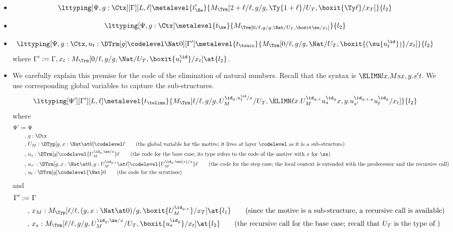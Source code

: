 \begin{itemize}
\item
  \[
    \lttyping[\Psi,g:\Ctx][\Gamma][L,\ell]\metalevel{t'_\Se}{M_\Trm[{2 + \ell}/\ell,g/g, \Ty{1 + \ell}/U_T,\boxit{\Ty \ell}/x_T]}{l_2}
  \]
\item
  \[
    \lttyping[\Psi, g : \Ctx]\metalevel{t_\ze}{M_\Trm[0/\ell,g/g,\Nat/U_T,\boxit \ze/x_t]}{l_2}    
  \]
\item 
  \[
    \lttyping[\Psi, g : \Ctx,u_t: \DTrm[g]\codelevel\Nat 0][\Gamma']\metalevel{t_\tsucc}{M_\Trm[0/\ell,g/g,\Nat/U_T,\boxit{(\su{u_t^\id})}/x_t]}{l_2}    
  \]
  where $\Gamma' := \Gamma, x_t:M_\Trm[0/\ell,g/g,\Nat/U_T,\boxit{u_t^\id}/x_t] \at{l_2}$.
\item We carefully explain this premise for the code of the elimination of natural
  numbers. %
  Recall that the syntax is $\ELIMN l{x.M}{s}{x,y.s'}t$. %
  We use corresponding global variables to capture the sub-structures. 
  \[
    \lttyping[\Psi'][\Gamma'][L,\ell]\metalevel{t_{\telimn}}{M_\Trm[\ell/\ell,g/g,U_M^{\id_g,u_t^\id/x}/U_T,\ELIMN \ell{x.U_M^{\id_{g,x}}}{u_s^{\id_g}}{x,y. u_{s'}^{\id_{g,x,y}}}{u_t^{\id_g}}/x_t]}{l_2}
  \]
  where
  \begin{align*}
    \Psi' :=&~ \Psi \\
    ,&~g : \Ctx \\
    ,&~U_M : \DTyp[g,x:\Nat\at 0]\codelevel \ell
       \tag{the global variable for the motive; it lives at layer $\codelevel$ as it is a sub-structure}\\
    ,&~u_s : \DTrm[g]\codelevel{U_M^{\id_g,\ze/x}}\ell
       \tag{the code for the base case; its type refers to the code of the motive with
       $x$ for $\ze$}\\
    ,&~u_{s'} : \DTrm[g, x : \Nat\at 0, y : U_M^{\id_{g,x}} \at
       \ell]\codelevel{U_M^{\id_g,\su{x}/x}}\ell
       \tag{the code for the step case; the local context is extended with the
       predecessor and the recursive call} \\
    ,&~u_t : \DTrm[g]\codelevel{\Nat}0
       \tag{the code for the scrutinee}
  \end{align*}
  and
  \begin{align*}
    \Gamma' :=&~\Gamma \\
    ,&~x_M : M_\Typ[\ell/\ell,(g,x:\Nat\at 0)/g,\boxit{U_M^{\id_{g,x}}}/x_T] \at{l_1}
       \tag{since the motive is a sub-structure, a recursive call is available}\\
    ,&~x_s : M_\Trm[\ell/\ell,g/g,U_M^{\id_g,\ze/x}/U_T,\boxit{u_s^{\id_g}}/x_t] \at{l_2}
       \tag{the recursive call for the base case; recall that $U_T$ is the type of
}
\end{align*}
\end{itemize}
